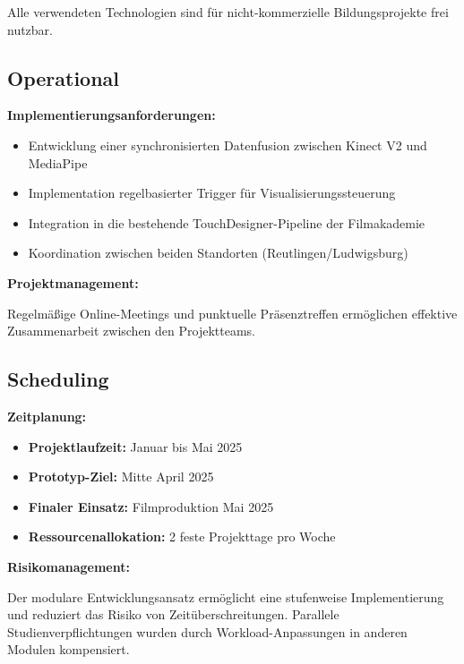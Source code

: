 Alle verwendeten Technologien sind für nicht-kommerzielle Bildungsprojekte frei nutzbar.

\subsection{Operational}

\textbf{Implementierungsanforderungen:}
\begin{itemize}
    \item Entwicklung einer synchronisierten Datenfusion zwischen Kinect V2 und MediaPipe
    \item Implementation regelbasierter Trigger für Visualisierungssteuerung
    \item Integration in die bestehende TouchDesigner-Pipeline der Filmakademie
    \item Koordination zwischen beiden Standorten (Reutlingen/Ludwigsburg)
\end{itemize}

\textbf{Projektmanagement:}
\raggedright Regelmäßige Online-Meetings und punktuelle Präsenztreffen ermöglichen effektive Zusammenarbeit zwischen den Projektteams.

\subsection{Scheduling}

\textbf{Zeitplanung:}
\begin{itemize}
    \item \textbf{Projektlaufzeit:} Januar bis Mai 2025
    \item \textbf{Prototyp-Ziel:} Mitte April 2025
    \item \textbf{Finaler Einsatz:} Filmproduktion Mai 2025
    \item \textbf{Ressourcenallokation:} 2 feste Projekttage pro Woche
\end{itemize}

\textbf{Risikomanagement:}
\raggedright Der modulare Entwicklungsansatz ermöglicht eine stufenweise Implementierung und reduziert das Risiko von Zeitüberschreitungen. Parallele Studienverpflichtungen wurden durch Workload-Anpassungen in anderen Modulen kompensiert.